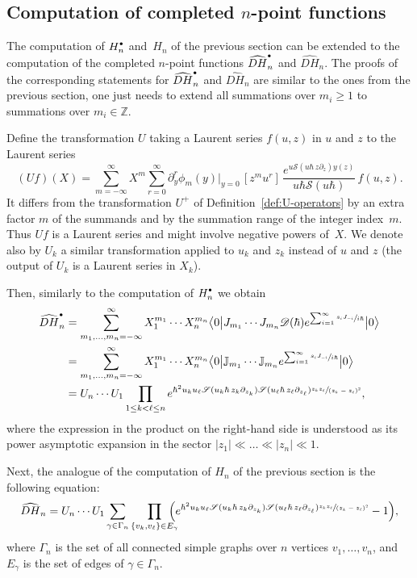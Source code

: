 \documentclass[JEP,XML,SOM,Unicode,NoEqCountersInSection,NoFloatCountersInSection]{cedram}
\let\mathcal\mathscr
\newcommand{\sbullet}{{\scriptscriptstyle\bullet}}
\newcommand{\csbullet}{{\raisebox{1pt}{$\sbullet$}}}
\theoremstyle{plain}
\theoremstyle{definition}
\theoremstyle{remark}
\newcommand{\cS}{\mathcal{S}}
\newcommand{\VEV}[1]{{\bigl\langle 0 \big| {#1} \big| 0 \bigr\rangle}}
\newcommand{\Hd}{H^\csbullet}
\newcommand{\euro}{\mathbb{J}}
\begin{document}
\subsection{Computation of completed \texorpdfstring{$n$}{n}-point functions}

The computation of $\Hd_n$ and~$H_n$ of the previous section can be extended to the computation of the completed $n$-point functions $\widehat{DH}^\csbullet_n$ and $\widehat{DH}_n$. The proofs of the corresponding statements for $\widehat{DH}^\csbullet_n$ and $\widehat{DH}_n$ are similar to the ones from the previous section, one just needs to extend all summations over $m_i\ge1$ to summations over $m_i\in \mathbb{Z}$.

Define the transformation $U$ taking a Laurent series $f(u,z)$ in $u$ and $z$ to the Laurent series
\begin{equation*}
(U f)(X)=\sum_{m=-\infty}^\infty X^{m}\sum_{r=0}^\infty
\partial_y^{r}\phi_{m}(y)\big|_{y=0}\,[z^mu^r]\,
\frac{e^{ u\cS(u\hbar\,z\partial_z)y(z) }}{u\hbar\cS(u\hbar)}\,f(u,z).
\end{equation*}
It differs from the transformation $U^+$ of Definition~\ref{def:U-operators} by an extra factor $m$ of the summands and by the summation range of the integer index~$m$. Thus $U f$ is a Laurent series and might involve negative powers of~$X$. We denote also by $U_k$ a similar transformation applied to $u_k$ and $z_k$ instead of $u$ and $z$ (the output of $U_k$ is a Laurent series in $X_k$).

Then, similarly to the computation of $\Hd_n$ we obtain
\begin{align*}
\widehat{DH}^\csbullet_n
&=\sum_{m_1,\dots,m_n=-\infty}^\infty
X_1^{m_1}\cdots X_n^{m_n}
\VEV{J_{m_1}\cdots J_{m_n}\mathcal{D}(\hbar)e^{\sum_{i=1}^\infty \sfrac{s_i J_{-i}}{i\hbar} }}\\
&=\sum_{m_1,\dots,m_n=-\infty}^\infty
X_1^{m_1}\cdots X_n^{m_n}
\VEV{\euro_{m_1}\cdots \euro_{m_n}e^{\sum_{i=1}^\infty \sfrac{s_i J_{-i}}{i\hbar} }}\\
&=U_n\cdots U_1
\prod_{1\le k<\ell\le n}
e^{\hbar^2u_ku_\ell\cS(u_k\hbar\,z_k\partial_{z_k})\cS(u_\ell\hbar\,z_\ell \partial_{z_\ell})
\sfrac{z_k z_\ell}{(z_k-z_\ell)^2}},
\end{align*}
where the expression in the product on the right-hand side is understood as its power asymptotic expansion in the sector $|z_1|\ll\dots\ll|z_n|\ll1$.

Next, the analogue of the computation of $H_n$ of the previous section is the following equation:
\begin{equation}\label{eq:hatDH}
\widehat{DH}_n
=U_n\cdots U_1
\sum_{\gamma \in \Gamma_n}\prod_{\{v_k,v_\ell\}\in E_\gamma}\hspace*{-3mm}
\Bigl(e^{\hbar^2u_ku_\ell\cS(u_k\hbar\,z_k\partial_{z_k})\cS(u_\ell\hbar\,z_\ell \partial_{z_\ell})
\sfrac{z_k z_\ell}{(z_k-z_\ell)^2}}-1\Bigr),
\end{equation}
where $\Gamma_n$ is the set of all connected simple graphs over $n$ vertices $v_1,\ldots,v_n$, and $E_\gamma$ is the set of edges of $\gamma \in \Gamma_n$.
\end{document}
